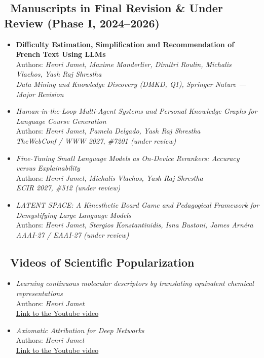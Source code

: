 \subsection{\submicon~\textcolor{Overleaf_green}{Manuscripts in Final Revision \& Under Review (Phase I, 2024--2026)}}
\begin{itemize}
  \item \textbf{Difficulty Estimation, Simplification and Recommendation of French Text Using LLMs}\\
  Authors: \textit{Henri Jamet, Maxime Manderlier, Dimitri Roulin, Michalis Vlachos, Yash Raj Shrestha}\\
  \textit{Data Mining and Knowledge Discovery (DMKD, Q1), Springer Nature --- Major Revision}

  \item \textsl{Human-in-the-Loop Multi-Agent Systems and Personal Knowledge Graphs for Language Course Generation}\\
  Authors: \textit{Henri Jamet, Pamela Delgado, Yash Raj Shrestha}\\
  \textit{TheWebConf / WWW 2027, \#7201 (under review)}

  \item \textsl{Fine-Tuning Small Language Models as On-Device Rerankers: Accuracy versus Explainability}\\
  Authors: \textit{Henri Jamet, Michalis Vlachos, Yash Raj Shrestha}\\
  \textit{ECIR 2027, \#512 (under review)}

  \item \textsl{LATENT SPACE: A Kinesthetic Board Game and Pedagogical Framework for Demystifying Large Language Models}\\
  Authors: \textit{Henri Jamet, Stergios Konstantinidis, Isna Bustoni, James Arnéra}\\
  \textit{AAAI-27 / EAAI-27 (under review)}
\end{itemize}

\subsection{\textcolor{black}{\youtubeicon}~\textcolor{Overleaf_green}{Videos of Scientific Popularization}}
\begin{itemize}
  \item \textsl{Learning continuous molecular descriptors by translating equivalent chemical representations}\\
  Authors: \textit{Henri Jamet}\\
  \href{https://www.youtube.com/watch?v=M9Wd-4E0fNw}{Link to the Youtube video}
  
  \item \textsl{Axiomatic Attribution for Deep Networks}\\
  Authors: \textit{Henri Jamet}\\
  \href{https://www.youtube.com/watch?v=WSeJBEcvVZU}{Link to the Youtube video}
\end{itemize}

